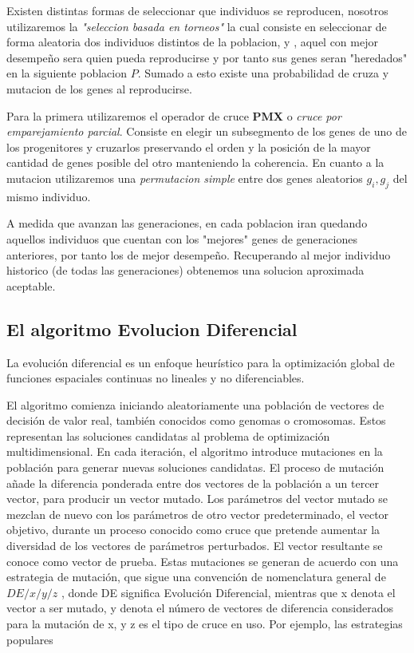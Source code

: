 \documentclass[10pt]{article}
\begin{document}
Existen distintas formas de seleccionar que individuos se reproducen, nosotros utilizaremos la \textit{"seleccion basada en torneos"} la cual consiste en seleccionar de forma aleatoria dos individuos distintos de la poblacion, y , aquel con mejor desempeño sera quien pueda reproducirse y por tanto sus genes seran "heredados" en la siguiente poblacion $P$. Sumado a esto existe una probabilidad de cruza y mutacion de los genes al reproducirse.

Para la primera utilizaremos el operador de cruce \textbf{PMX} o \textit{cruce por emparejamiento parcial}. Consiste en elegir un subsegmento de los genes de uno de los progenitores y cruzarlos preservando el orden y la posición de la mayor cantidad de genes posible del otro manteniendo la coherencia.
En cuanto a la mutacion utilizaremos una \textit{permutacion simple} entre dos genes aleatorios $g_i,g_j$ del mismo individuo.

A medida que avanzan las generaciones, en cada poblacion iran quedando aquellos individuos que cuentan con los "mejores"  genes de generaciones anteriores, por tanto los de mejor desempeño. Recuperando al mejor individuo historico (de todas las generaciones) obtenemos una solucion aproximada aceptable.

\subsection{El algoritmo Evolucion Diferencial}

La evolución diferencial es un enfoque heurístico para la optimización global de funciones espaciales continuas no lineales y no diferenciables. 

El algoritmo comienza iniciando aleatoriamente una población de vectores de decisión de valor real, también conocidos como genomas o cromosomas. Estos representan las soluciones candidatas al problema de optimización multidimensional.\newline
En cada iteración, el algoritmo introduce mutaciones en la población para generar nuevas soluciones candidatas. El proceso de mutación añade la diferencia ponderada entre dos vectores de la población a un tercer vector, para producir un vector mutado. Los parámetros del vector mutado se mezclan de nuevo con los parámetros de otro vector predeterminado, el vector objetivo, durante un proceso conocido como cruce que pretende aumentar la diversidad de los vectores de parámetros perturbados. El vector resultante se conoce como vector de prueba.
Estas mutaciones se generan de acuerdo con una estrategia de mutación, que sigue una convención de nomenclatura general de $DE/x/y/z$ , donde DE significa Evolución Diferencial, mientras que x denota el vector a ser mutado, y denota el número de vectores de diferencia considerados para la mutación de x, y z es el tipo de cruce en uso. Por ejemplo, las estrategias populares
\end{document}
